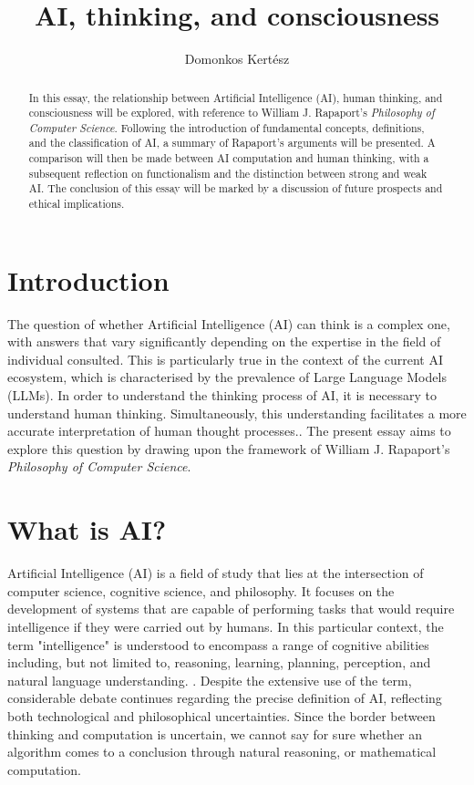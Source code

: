 \documentclass[runningheads]{llncs}
\begin{document}
%
%
\title{AI, thinking, and consciousness}
\author{Domonkos Kertész\\
}
%
%
\maketitle
%
%
%
%
%
\begin{abstract}
In this essay, the relationship between Artificial Intelligence (AI), human thinking, and consciousness will be explored, with reference to William J. Rapaport's \textit{Philosophy of Computer Science}. Following the introduction of fundamental concepts, definitions, and the classification of AI, a summary of Rapaport's arguments will be presented. A comparison will then be made between AI computation and human thinking, with a subsequent reflection on functionalism and the distinction between strong and weak AI. The conclusion of this essay will be marked by a discussion of future prospects and ethical implications.
\end{abstract}
%
%
%
%
%
\section{Introduction}
%
The question of whether Artificial Intelligence (AI) can think is a complex one, with answers that vary significantly depending on the expertise in the field of individual consulted. This is particularly true in the context of the current AI ecosystem, which is characterised by the prevalence of Large Language Models (LLMs). In order to understand the thinking process of AI, it is necessary to understand human thinking. Simultaneously, this understanding facilitates a more accurate interpretation of human thought processes.\cite{rapaport2005philosophy}. The present essay aims to explore this question by drawing upon the framework of William J. Rapaport's \textit{Philosophy of Computer Science}.
%
%
\section{What is AI?}
%
Artificial Intelligence (AI) is a field of study that lies at the intersection of computer science, cognitive science, and philosophy. It focuses on the development of systems that are capable of performing tasks that would require intelligence if they were carried out by humans. In this particular context, the term "intelligence" is understood to encompass a range of cognitive abilities including, but not limited to, reasoning, learning, planning, perception, and natural language understanding. \cite{russell2010artificial}. Despite the extensive use of the term, considerable debate continues regarding the precise definition of AI, reflecting both technological and philosophical uncertainties. Since the border between thinking and computation is uncertain, we cannot say for sure whether an algorithm comes to a conclusion through natural reasoning, or mathematical computation.
%
%
\end{document}

